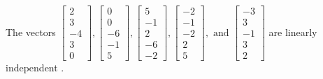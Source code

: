 \begin{exercise}
\begin{exerciseStatement}
  \end{exerciseStatement}
  \begin{exerciseAnswer}
   The vectors \(\left[\begin{array}{r}
2 \\
3 \\
-4 \\
3 \\
0
\end{array}\right] , \left[\begin{array}{r}
0 \\
0 \\
-6 \\
-1 \\
5
\end{array}\right] , \left[\begin{array}{r}
5 \\
-1 \\
2 \\
-6 \\
-2
\end{array}\right] , \left[\begin{array}{r}
-2 \\
-1 \\
-2 \\
2 \\
5
\end{array}\right] , \text{ and } \left[\begin{array}{r}
-3 \\
3 \\
-1 \\
3 \\
2
\end{array}\right]\) are 
  	 linearly independent  .
  


  \end{exerciseAnswer}
\end{exercise}
